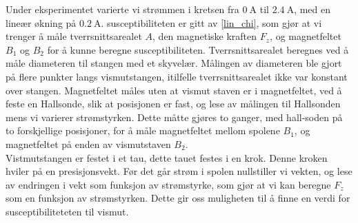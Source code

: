 \documentclass[%
 reprint,
 amsmath,amssymb,
 aps,
 norsk,
]{revtex4-1}
\begin{document}
Under eksperimentet varierte vi strømmen i kretsen fra $\SI{0}{\ampere}$ til $\SI{2.4}{\ampere}$, med en lineær økning på $\SI{0.2}{\ampere}$. susceptibiliteten er gitt av \eqref{lin_chi}, som gjør at vi trenger å måle tverrsnittsarealet $A$, den magnetiske kraften $F_z$, og magnetfeltet $B_1$ og $B_2$ for å kunne beregne susceptibiliteten. Tverrsnittsarealet beregnes ved å måle diameteren til stangen med et skyvelær. Målingen av diameteren ble gjort på flere punkter langs vismutstangen, itilfelle tverrsnittsarealet ikke var konstant over stangen. Magnetfeltet måles uten at vismut staven er i magnetfeltet, ved å feste en Hallsonde, slik at posisjonen er fast, og lese av målingen til Hallsonden mens vi varierer strømstyrken. Dette måtte gjøres to ganger, med hall-soden på to forskjellige posisjoner, for å måle magnetfeltet mellom spolene $B_1$, og magnetfeltet på enden av vismutstaven $B_2$. \\
Vistmutstangen er festet i et tau, dette tauet festes i en krok. Denne kroken hviler på en presisjonsvekt. Før det går strøm i spolen nullstiller vi vekten, og lese av endringen i vekt som funksjon av strømstyrke, som gjør at vi kan beregne $F_z$ som en funksjon av strømstyrken. Dette gir oss muligheten til å finne en verdi for susceptibiliteteten til vismut.
\end{document}
